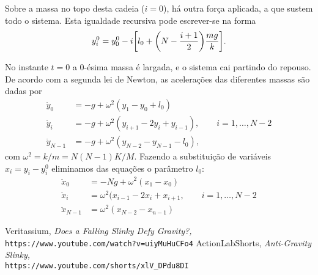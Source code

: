 \documentclass{article}
\begin{document}
\vspace{0.75em}
\noindent
Sobre a massa no topo desta cadeia ($i=0$), há outra força aplicada, a que
sustem todo o sistema. Esta igualdade recursiva pode escrever-se na forma
\begin{equation}
  y^0_i = y^0_0 - i\qty[l_0 + \qty(N-\frac{i+1}{2})\frac{mg}{k}].
\end{equation}

No instante $t=0$ a 0-ésima massa é largada, e o sistema cai partindo do
repouso. De acordo com a segunda lei de Newton, as acelerações das diferentes
massas são dadas por
\begin{equation}
  \begin{aligned}
    \ddot y_0     &= -g + \omega^2 (y_1-y_0+l_0)\\
    \ddot y_i     &= -g + \omega^2 
      (y_{i+1}-2y_i+y_{i-1}),\qquad i=1, \ldots, N-2\\
    \ddot y_{N-1} &= -g + \omega^2 (y_{N-2}-y_{N-1}-l_0),
  \end{aligned}
\end{equation}
com $\omega^2=k/m=N(N-1)K/M$. Fazendo a substituição de variáveis $x_i=y_i -
y_i^0$ eliminamos das equações o parâmetro $l_0$:
\begin{equation}
  \begin{aligned}
    \ddot x_0 &=-Ng+\omega^2(x_1-x_0)\\
    \ddot x_i &= \omega^2(x_{i-1}-2x_i+x_{i+1},\qquad i=1, \ldots, N-2\\
    \ddot x_{N-1} &=\omega^2(x_{N-2}-x_{n-1})
  \end{aligned}
\end{equation}



\begin{thebibliography}{100}
   Veritassium, 
    \textsl{Does a Falling Slinky Defy Gravity?,}\\
    \texttt{https://www.youtube.com/watch?v=uiyMuHuCFo4}
      ActionLabShorts,
      \textsl{Anti-Gravity Slinky,}\\
      \texttt{https://www.youtube.com/shorts/xlV\_DPdu8DI}
\end{thebibliography}
\end{document}
